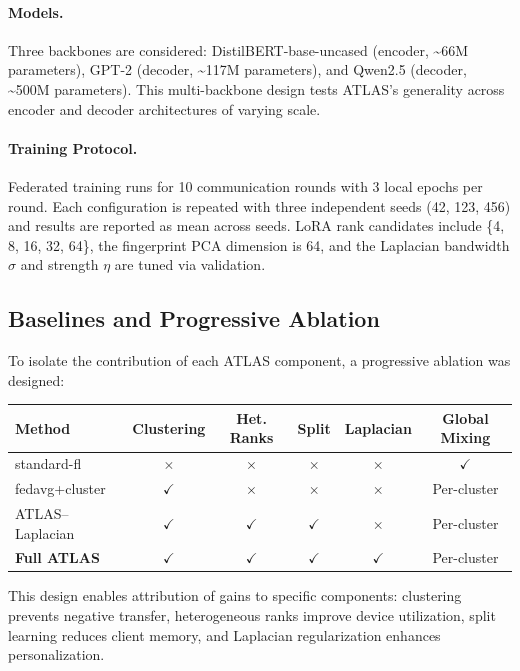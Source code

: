 \documentclass[11pt,a4paper]{article}
\begin{document}
\paragraph{Models.}
Three backbones are considered: DistilBERT-base-uncased (encoder, \textasciitilde66M parameters), GPT-2 (decoder, \textasciitilde117M parameters), and Qwen2.5 (decoder, \textasciitilde500M parameters). This multi-backbone design tests ATLAS's generality across encoder and decoder architectures of varying scale.

\paragraph{Training Protocol.}
Federated training runs for 10 communication rounds with 3 local epochs per round. Each configuration is repeated with three independent seeds (42, 123, 456) and results are reported as mean across seeds. LoRA rank candidates include \{4, 8, 16, 32, 64\}, the fingerprint PCA dimension is 64, and the Laplacian bandwidth $\sigma$ and strength $\eta$ are tuned via validation.

\subsection{Baselines and Progressive Ablation}

To isolate the contribution of each ATLAS component, a progressive ablation was designed:

\begin{center}
\begin{tabular}{lccccc}
\toprule
\textbf{Method} & \textbf{Clustering} & \textbf{Het. Ranks} & \textbf{Split} & \textbf{Laplacian} & \textbf{Global Mixing}\\
\midrule
standard-fl & $\times$ & $\times$ & $\times$ & $\times$ & $\checkmark$\\
fedavg+cluster & $\checkmark$ & $\times$ & $\times$ & $\times$ & Per-cluster\\
ATLAS--Laplacian & $\checkmark$ & $\checkmark$ & $\checkmark$ & $\times$ & Per-cluster\\
\textbf{Full ATLAS} & $\checkmark$ & $\checkmark$ & $\checkmark$ & $\checkmark$ & Per-cluster\\
\bottomrule
\end{tabular}
\end{center}

This design enables attribution of gains to specific components: clustering prevents negative transfer, heterogeneous ranks improve device utilization, split learning reduces client memory, and Laplacian regularization enhances personalization.
\end{document}
